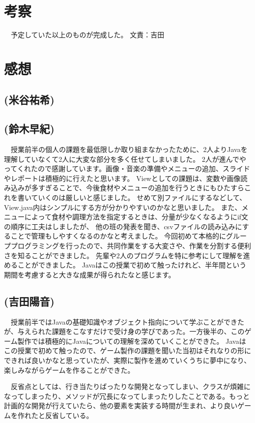 \documentclass[a4j]{jsarticle} %
\begin{document}
\newpage

\section{考察}
　予定していた以上のものが完成した。%
文責：吉田

\section{感想}
\subsection*{(米谷祐希)}
\subsection*{(鈴木早紀)}
　授業前半の個人の課題を最低限しか取り組まなかったために、2人よりJavaを理解していなくて2人に大変な部分を多く任せてしまいました。
2人が進んでやってくれたので感謝しています。画像・音楽の準備やメニューの追加、スライドやレポートは積極的に行えたと思います。
Viewとしての課題は、変数や画像読み込みが多すぎることで、今後食材やメニューの追加を行うときにもひたすらこれを書いていくのは厳しいと感じました。
せめて別ファイルにするなどして、View.java内はシンプルにする方が分かりやすいのかなと思いました。
また、メニューによって食材や調理方法を指定するときは、分量が少なくなるようにif文の順序に工夫はしましたが、
他の班の発表を聞き、csvファイルの読み込みにすることで管理もしやすくなるのかなと考えました。
今回初めて本格的にグループプログラミングを行ったので、共同作業をする大変さや、作業を分割する便利さを知ることができました。
先輩や2人のプログラムを特に参考にして理解を進めることができました。
Javaはこの授業で初めて触ったけれど、半年間という期間を考慮すると大きな成果が得られたなと感じます。
\subsection*{(吉田陽音)}
　授業前半ではJavaの基礎知識やオブジェクト指向について学ぶことができたが、与えられた課題をこなすだけで受け身の学びであった。一方後半の、このゲーム製作では積極的にJavaについての理解を深めていくことができた。
Javaはこの授業で初めて触ったので、ゲーム製作の課題を聞いた当初はそれなりの形にできれば良いかなと思っていたが、実際に製作を進めていくうちに夢中になり、楽しみながらゲームを作ることができた。

　反省点としては、行き当たりばったりな開発となってしまい、クラスが煩雑になってしまったり、メソッドが冗長になってしまったりしたことである。もっと計画的な開発が行えていたら、他の要素を実装する時間が生まれ、より良いゲームを作れたと反省している。
\end{document}

